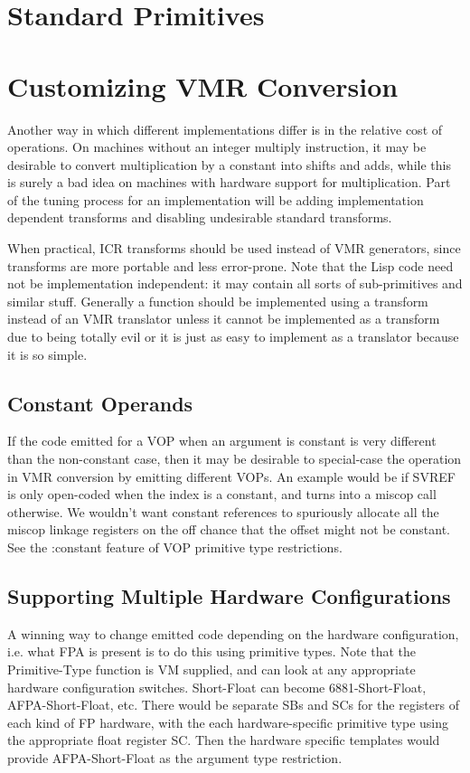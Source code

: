 
\chapter{Standard Primitives}


\chapter{Customizing VMR Conversion}

Another way in which different implementations differ is in the relative cost
of operations.  On machines without an integer multiply instruction, it may be
desirable to convert multiplication by a constant into shifts and adds, while
this is surely a bad idea on machines with hardware support for multiplication.
Part of the tuning process for an implementation will be adding implementation
dependent transforms and disabling undesirable standard transforms.

When practical, ICR transforms should be used instead of VMR generators, since
transforms are more portable and less error-prone.  Note that the Lisp code
need not be implementation independent: it may contain all sorts of
sub-primitives and similar stuff.  Generally a function should be implemented
using a transform instead of an VMR translator unless it cannot be implemented
as a transform due to being totally evil or it is just as easy to implement as
a translator because it is so simple.


\section{Constant Operands}

If the code emitted for a VOP when an argument is constant is very different
than the non-constant case, then it may be desirable to special-case the
operation in VMR conversion by emitting different VOPs.  An example would be if
SVREF is only open-coded when the index is a constant, and turns into a miscop
call otherwise.  We wouldn't want constant references to spuriously allocate
all the miscop linkage registers on the off chance that the offset might not be
constant.  See the :constant feature of VOP primitive type restrictions.


\section{Supporting Multiple Hardware Configurations}


A winning way to change emitted code depending on the hardware configuration,
i.e. what FPA is present is to do this using primitive types.  Note that the
Primitive-Type function is VM supplied, and can look at any appropriate
hardware configuration switches.  Short-Float can become 6881-Short-Float,
AFPA-Short-Float, etc.  There would be separate SBs and SCs for the registers
of each kind of FP hardware, with the each hardware-specific primitive type
using the appropriate float register SC.  Then the hardware specific templates
would provide AFPA-Short-Float as the argument type restriction.

